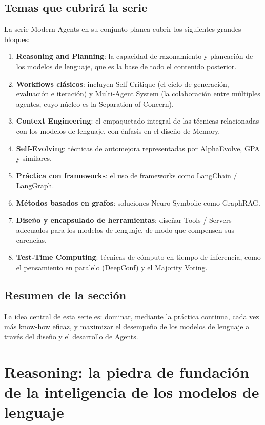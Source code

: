\documentclass[a4paper]{article}
\begin{document}
\subsection{Temas que cubrirá la serie}

La serie Modern Agents en su conjunto planea cubrir los siguientes grandes bloques:

\begin{enumerate}
    \item \textbf{Reasoning and Planning}: la capacidad de razonamiento y planeación de los modelos de lenguaje, que es la base de todo el contenido posterior.
    \item \textbf{Workflows clásicos}: incluyen Self-Critique (el ciclo de generación, evaluación e iteración) y Multi-Agent System (la colaboración entre múltiples agentes, cuyo núcleo es la Separation of Concern).
    \item \textbf{Context Engineering}: el empaquetado integral de las técnicas relacionadas con los modelos de lenguaje, con énfasis en el diseño de Memory.
    \item \textbf{Self-Evolving}: técnicas de automejora representadas por AlphaEvolve, GPA y similares.
    \item \textbf{Práctica con frameworks}: el uso de frameworks como LangChain / LangGraph.
    \item \textbf{Métodos basados en grafos}: soluciones Neuro-Symbolic como GraphRAG.
    \item \textbf{Diseño y encapsulado de herramientas}: diseñar Tools / Servers adecuados para los modelos de lenguaje, de modo que compensen sus carencias.
    \item \textbf{Test-Time Computing}: técnicas de cómputo en tiempo de inferencia, como el pensamiento en paralelo (DeepConf) y el Majority Voting.
\end{enumerate}

\subsection{Resumen de la sección}

La idea central de esta serie es: dominar, mediante la práctica continua, cada vez más know-how eficaz, y maximizar el desempeño de los modelos de lenguaje a través del diseño y el desarrollo de Agents.

\section{Reasoning: la piedra de fundación de la inteligencia de los modelos de lenguaje}
\end{document}
